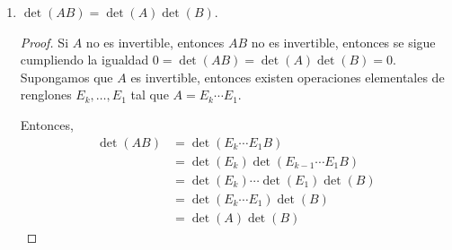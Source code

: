 \documentclass[letterpaper]{article}
\begin{document}
\begin{enumerate}
\begin{enumerate}[label=(\alph*)]
\begin{proof}
\begin{align*}
\begin{pmatrix}
                a_s\\
                \vdots\\
                a_n
            \end{pmatrix} +
            \det\begin{pmatrix}
                a_1\\
                \vdots\\
                a_s\\
                \vdots\\
                a_r\\
                \vdots\\
                a_n
            \end{pmatrix} +
            \det\begin{pmatrix}
                a_1\\
                \vdots\\
                a_s\\
                \vdots\\
                a_s\\
                \vdots\\
                a_n
            \end{pmatrix}\\
        &=
            0 + \det(A) + \det(C) + 0
    \end{align*}
    Por tanto $\det(C) = -\det(A)$.
    \end{proof}

    \item $\det(AB) = \det(A)\det(B)$.
    \begin{proof}
    Si $A$ no es invertible, entonces $AB$ no es invertible, entonces se sigue cumpliendo la igualdad
    $0 = \det(AB) = \det(A)\det(B) = 0$. Supongamos que $A$ es invertible, entonces existen operaciones
    elementales de renglones $E_k, \ldots, E_1$ tal que $A = E_k \cdots E_1$.

    Entonces,
    \begin{align*}
        \det(AB)
            &= \det(E_k \cdots E_1 B)\\
            &= \det(E_k) \det(E_{k-1} \cdots E_1  B)\\
            &= \det(E_k) \cdots \det(E_1)\det(B)\\
            &= \det(E_k \cdots E_1)\det(B)\\
            &= \det(A)\det(B)
    \end{align*}
    \end{proof}


\end{enumerate}
\end{enumerate}
\end{document}
